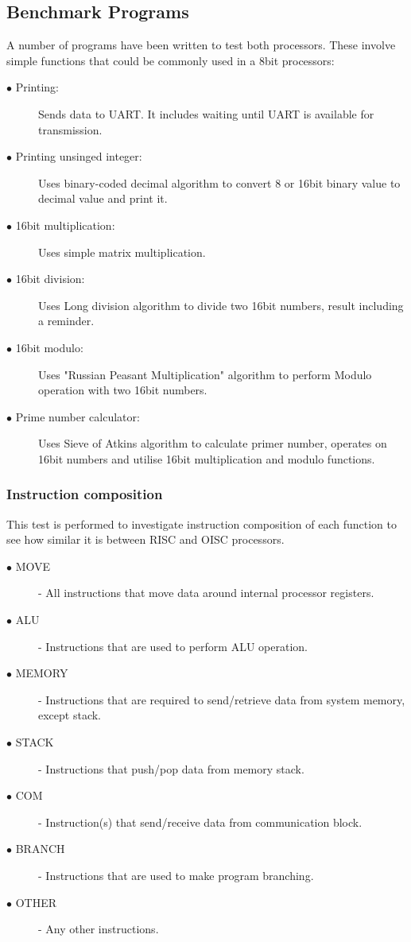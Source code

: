 \subsection{Benchmark Programs}
A number of programs have been written to test both processors. These involve simple functions that could be commonly used in a 8bit processors:

\begin{description}
	\item[$\bullet$ Printing:] Sends data to UART. It includes waiting until UART is available for transmission. 
	\item[$\bullet$ Printing unsinged integer:] Uses binary-coded decimal algorithm to convert 8 or 16bit binary value to decimal value and print it. 
	\item[$\bullet$ 16bit multiplication:] Uses simple matrix multiplication. 
	\item[$\bullet$ 16bit division:] Uses Long division algorithm to divide two 16bit numbers, result including a reminder.
	\item[$\bullet$ 16bit modulo:] Uses "Russian Peasant Multiplication" algorithm to perform Modulo operation with two 16bit numbers.
	\item[$\bullet$ Prime number calculator:] Uses Sieve of Atkins algorithm \autocite{morain_1989} to calculate primer number, operates on 16bit numbers and utilise 16bit multiplication and modulo functions. 
\end{description}


\subsubsection{Instruction composition}\label{subsec:instr_comp}

This test is performed to investigate instruction composition of each function to see how similar it is between RISC and OISC processors. 
\begin{description}
	\item[$\bullet$ MOVE] - All instructions that move data around internal processor registers.
	\item[$\bullet$ ALU] - Instructions that are used to perform ALU operation.
	\item[$\bullet$ MEMORY] - Instructions that are required to send/retrieve data from system memory, except stack.
	\item[$\bullet$ STACK] - Instructions that push/pop data from memory stack.
	\item[$\bullet$ COM] - Instruction(s) that send/receive data from communication block.
	\item[$\bullet$ BRANCH] - Instructions that are used to make program branching.
	\item[$\bullet$ OTHER] - Any other instructions.
\end{description}

